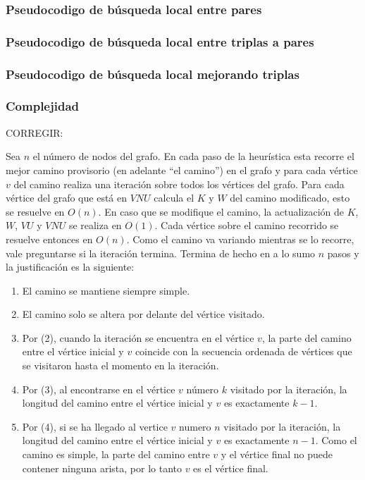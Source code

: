 \subsubsection{Pseudocodigo de b\'usqueda local entre pares}

\begin{algorithmic}





\end{algorithmic}

\subsubsection{Pseudocodigo de b\'usqueda local entre triplas a pares}

\subsubsection{Pseudocodigo de b\'usqueda local mejorando triplas}

\subsubsection{Complejidad}

CORREGIR:

Sea $n$ el n\'umero de nodos del grafo. En cada paso de la heur\'istica esta recorre el mejor camino provisorio (en adelante ``el camino'') en el grafo y para cada v\'ertice $v$ del camino realiza una iteraci\'on sobre todos los v\'ertices del grafo.
Para cada v\'ertice del grafo que est\'a en $VNU$ calcula el $K$ y $W$ del camino modificado, esto se resuelve en $O(n)$. En caso que se modifique el camino, la actualizaci\'on de $K$, $W$, $VU$ y $VNU$ se realiza en $O(1)$. Cada v\'ertice sobre el camino recorrido se resuelve entonces en $O(n)$.
Como el camino va variando mientras se lo recorre, vale preguntarse si la iteraci\'on termina. Termina de hecho en a lo sumo $n$ pasos y la justificaci\'on es la siguiente:

\begin{enumerate}
	\item El camino se mantiene siempre simple.
	\item El camino solo se altera por delante del v\'ertice visitado.
	\item Por (2), cuando la iteraci\'on se encuentra en el v\'ertice $v$, la parte del camino entre el v\'ertice inicial y $v$ coincide con la secuencia ordenada de v\'ertices que se visitaron hasta el momento en la iteraci\'on.
	\item Por (3), al encontrarse en el v\'ertice $v$ n\'umero $k$ visitado por la iteraci\'on, la longitud del camino entre el v\'ertice inicial y $v$ es exactamente $k-1$.
	\item Por (4), si se ha llegado al vertice $v$ numero $n$ visitado por la iteraci\'on, la longitud del camino entre el v\'ertice inicial y $v$ es exactamente $n-1$. Como el camino es simple, la parte del camino entre $v$ y el v\'ertice final no puede contener ninguna arista, por lo tanto $v$ es el v\'ertice final.
\end{enumerate}

